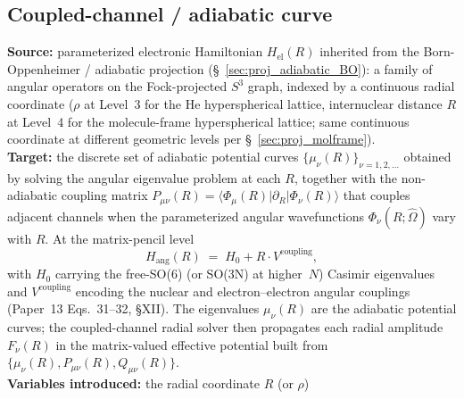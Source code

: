
\subsection{Coupled-channel / adiabatic curve}
\label{sec:proj_coupled_channel}
\textbf{Source:} parameterized electronic Hamiltonian $H_\text{el}(R)$
inherited from the Born-Oppenheimer / adiabatic projection
(\S~\ref{sec:proj_adiabatic_BO}): a family of angular operators on
the Fock-projected $S^3$ graph, indexed by a continuous radial
coordinate ($\rho$ at Level~3 for the He hyperspherical lattice,
internuclear distance $R$ at Level~4 for the molecule-frame
hyperspherical lattice; same continuous coordinate at different
geometric levels per \S~\ref{sec:proj_molframe}).\\
\textbf{Target:} the discrete set of adiabatic potential curves
$\{\mu_\nu(R)\}_{\nu = 1, 2, \ldots}$ obtained by solving the angular
eigenvalue problem at each $R$, together with the non-adiabatic
coupling matrix $P_{\mu\nu}(R) = \langle \Phi_\mu(R) | \partial_R |
\Phi_\nu(R) \rangle$ that couples adjacent channels when the
parameterized angular wavefunctions $\Phi_\nu(R; \hat{\Omega})$ vary
with $R$.  At the matrix-pencil level
\[
  H_\text{ang}(R) \;=\; H_0 + R \cdot V^\text{coupling},
\]
with $H_0$ carrying the free-SO(6) (or SO(3N) at higher~$N$) Casimir
eigenvalues and $V^\text{coupling}$ encoding the nuclear and
electron--electron angular couplings (Paper~13 Eqs.~31--32, §XII).
The eigenvalues $\mu_\nu(R)$ are the adiabatic potential curves; the
coupled-channel radial solver then propagates each radial amplitude
$F_\nu(R)$ in the matrix-valued effective potential built from
$\{\mu_\nu(R), P_{\mu\nu}(R), Q_{\mu\nu}(R)\}$.\\
\textbf{Variables introduced:} the radial coordinate $R$ (or $\rho$)
